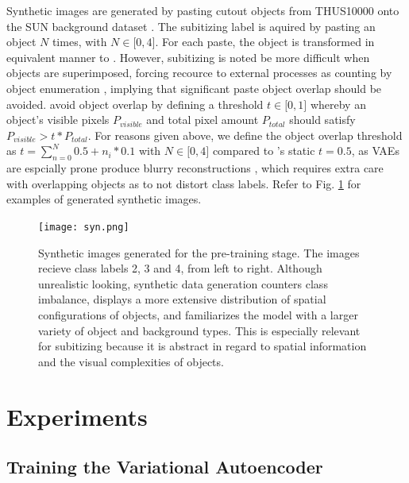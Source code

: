 \documentclass[twocolumn]{article}
\begin{document}
Synthetic images are generated by pasting cutout objects from THUS10000
\citep{cheng2015global} onto the SUN background dataset
\citep{xiao2010sun}. The subitizing label is aquired by pasting an
object \(N\) times, with \(N \in \lbrack0, 4\rbrack\). For each paste,
the object is transformed in equivalent manner to
\citet{zhang2016salient}. However, subitizing is noted be more difficult
when objects are superimposed, forcing recource to external processes as
counting by object enumeration \citep[p.~57.]{dehaene2011number},
implying that significant paste object overlap should be avoided.
\citet{zhang2016salient} avoid object overlap by defining a threshold
\(t \in \lbrack0,1\rbrack\) whereby an object's visible pixels
\(P_{visible}\) and total pixel amount \(P_{total}\) should satisfy
\(P_{visible} > t * P_{total}\). For reasons given above, we define the
object overlap threshold as \(t = \sum_{n=0}^{N} 0.5 + n_i * 0.1\) with
\(N \in \lbrack0,4\rbrack\) compared to \citet{zhang2016salient}'s
static \(t=0.5\), as VAEs are espcially prone produce blurry
reconstructions \citep{hou2017deep, larsen2015autoencoding}, which
requires extra care with overlapping objects as to not distort class
labels. Refer to Fig. \ref{fig:syn} for examples of generated synthetic images.


\begin{figure}
\centering
\texttt{[image: syn.png]}
\caption{Synthetic images generated for the pre-training stage. The images recieve class labels 2, 3 and 4, from left to right. Although unrealistic looking, synthetic data generation counters class imbalance, displays a more extensive distribution of spatial configurations of objects, and familiarizes the model with a larger variety of object and background types. This is especially relevant for subitizing because it is abstract in regard to spatial information and the visual complexities of objects.}
\label{fig:syn}
\end{figure}

\hypertarget{experiments}{%
\section{Experiments}\label{experiments}}

\hypertarget{vae-train}{%
\subsection{Training the Variational Autoencoder} \label{vae-train}}
\end{document}
